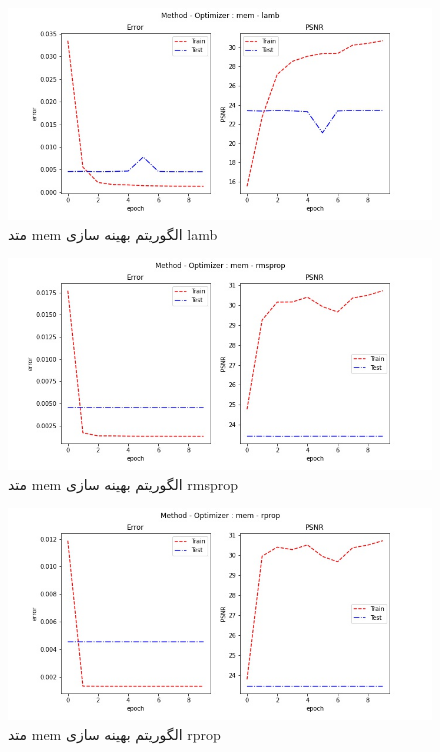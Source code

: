  \begin{figure}[!h] 
       \centering 
       \includegraphics[width=160mm]{./chapter3/images/error-psnr-mem-lamb.jpg}
       \caption{متد mem الگوریتم بهینه سازی lamb}
       \label{fig:error-psnr-mem-lamb}
 \end{figure}
 \begin{figure}[!h] 
       \centering 
       \includegraphics[width=160mm]{./chapter3/images/error-psnr-mem-rmsprop.jpg}
       \caption{متد mem الگوریتم بهینه سازی rmsprop}
       \label{fig:error-psnr-mem-rmsprop}
 \end{figure}
 \begin{figure}[!h] 
       \centering 
       \includegraphics[width=160mm]{./chapter3/images/error-psnr-mem-rprop.jpg}
       \caption{متد mem الگوریتم بهینه سازی rprop}
       \label{fig:error-psnr-mem-rprop}
 \end{figure}
